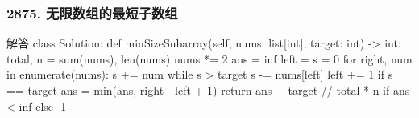 \begin{frame}[fragile]          %
  \frametitle{\textsc{2875. 无限数组的最短子数组}}
  \begin{codeblock}[language=python]{解答}
class Solution:
  def minSizeSubarray(self, nums: list[int], target: int) -> int:
    total, n = sum(nums), len(nums)
    nums *= 2
    ans = inf
    left = s = 0
    for right, num in enumerate(nums):
        s += num
        while s > target %
            s -= nums[left]
            left += 1
        if s == target %
            ans = min(ans, right - left + 1)
    return ans + target // total * n if ans < inf else -1
  \end{codeblock}
\end{frame}